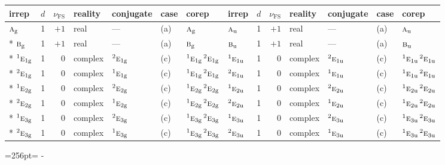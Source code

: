 \documentclass[10pt,a4paper]{article}
\newcommand{\needspace}[1]{\par\penalty-100\begingroup\dimen0=#1\relax\dimen2=\pagegoal
  \advance\dimen2-\pagetotal\ifdim\dimen0>\dimen2\relax\ifdim\dimen2>0pt\vfil\break\fi\fi
  \endgroup}
\numberwithin{equation}{section}
\newcommand{\irr}[1]{\text{\normalfont\scshape #1}}
\newcommand{\conjpair}[1]{{}^{#1}}
\newcommand{\ptag}[1]{\mathrm{#1}}
\newcommand{\fsind}{\nu_{\mathrm{FS}}}
\begin{document}
{\small\renewcommand{\arraystretch}{1.25}\setlength{\tabcolsep}{4pt}\begin{longtable}{@{}lrrllll@{\hspace{18pt}}lrrllll@{}}\toprule
irrep & $d$ & $\fsind$ & reality & conjugate & case & corep & irrep & $d$ & $\fsind$ & reality & conjugate & case & corep\\\midrule\endhead
\bottomrule\endfoot\endlastfoot
$\irr{a}_{\ptag{g}}$ & 1 & $+1$ & real & --- & (a) & $\irr{a}_{\ptag{g}}$ & $\irr{a}_{\ptag{u}}$ & 1 & $+1$ & real & --- & (a) & $\irr{a}_{\ptag{u}}$\\*
$\irr{b}_{\ptag{g}}$ & 1 & $+1$ & real & --- & (a) & $\irr{b}_{\ptag{g}}$ & $\irr{b}_{\ptag{u}}$ & 1 & $+1$ & real & --- & (a) & $\irr{b}_{\ptag{u}}$\\*
$\conjpair{1}\irr{e}_{1\ptag{g}}$ & 1 & $0$ & complex & $\conjpair{2}\irr{e}_{1\ptag{g}}$ & (c) & $\conjpair{1}\irr{e}_{1\ptag{g}}\,\conjpair{2}\irr{e}_{1\ptag{g}}$ & $\conjpair{1}\irr{e}_{1\ptag{u}}$ & 1 & $0$ & complex & $\conjpair{2}\irr{e}_{1\ptag{u}}$ & (c) & $\conjpair{1}\irr{e}_{1\ptag{u}}\,\conjpair{2}\irr{e}_{1\ptag{u}}$\\*
$\conjpair{2}\irr{e}_{1\ptag{g}}$ & 1 & $0$ & complex & $\conjpair{1}\irr{e}_{1\ptag{g}}$ & (c) & $\conjpair{1}\irr{e}_{1\ptag{g}}\,\conjpair{2}\irr{e}_{1\ptag{g}}$ & $\conjpair{2}\irr{e}_{1\ptag{u}}$ & 1 & $0$ & complex & $\conjpair{1}\irr{e}_{1\ptag{u}}$ & (c) & $\conjpair{1}\irr{e}_{1\ptag{u}}\,\conjpair{2}\irr{e}_{1\ptag{u}}$\\*
$\conjpair{1}\irr{e}_{2\ptag{g}}$ & 1 & $0$ & complex & $\conjpair{2}\irr{e}_{2\ptag{g}}$ & (c) & $\conjpair{1}\irr{e}_{2\ptag{g}}\,\conjpair{2}\irr{e}_{2\ptag{g}}$ & $\conjpair{1}\irr{e}_{2\ptag{u}}$ & 1 & $0$ & complex & $\conjpair{2}\irr{e}_{2\ptag{u}}$ & (c) & $\conjpair{1}\irr{e}_{2\ptag{u}}\,\conjpair{2}\irr{e}_{2\ptag{u}}$\\*
$\conjpair{2}\irr{e}_{2\ptag{g}}$ & 1 & $0$ & complex & $\conjpair{1}\irr{e}_{2\ptag{g}}$ & (c) & $\conjpair{1}\irr{e}_{2\ptag{g}}\,\conjpair{2}\irr{e}_{2\ptag{g}}$ & $\conjpair{2}\irr{e}_{2\ptag{u}}$ & 1 & $0$ & complex & $\conjpair{1}\irr{e}_{2\ptag{u}}$ & (c) & $\conjpair{1}\irr{e}_{2\ptag{u}}\,\conjpair{2}\irr{e}_{2\ptag{u}}$\\*
$\conjpair{1}\irr{e}_{3\ptag{g}}$ & 1 & $0$ & complex & $\conjpair{2}\irr{e}_{3\ptag{g}}$ & (c) & $\conjpair{1}\irr{e}_{3\ptag{g}}\,\conjpair{2}\irr{e}_{3\ptag{g}}$ & $\conjpair{1}\irr{e}_{3\ptag{u}}$ & 1 & $0$ & complex & $\conjpair{2}\irr{e}_{3\ptag{u}}$ & (c) & $\conjpair{1}\irr{e}_{3\ptag{u}}\,\conjpair{2}\irr{e}_{3\ptag{u}}$\\*
$\conjpair{2}\irr{e}_{3\ptag{g}}$ & 1 & $0$ & complex & $\conjpair{1}\irr{e}_{3\ptag{g}}$ & (c) & $\conjpair{1}\irr{e}_{3\ptag{g}}\,\conjpair{2}\irr{e}_{3\ptag{g}}$ & $\conjpair{2}\irr{e}_{3\ptag{u}}$ & 1 & $0$ & complex & $\conjpair{1}\irr{e}_{3\ptag{u}}$ & (c) & $\conjpair{1}\irr{e}_{3\ptag{u}}\,\conjpair{2}\irr{e}_{3\ptag{u}}$\\
\bottomrule\end{longtable}}
\needspace{256pt}
\end{document}
